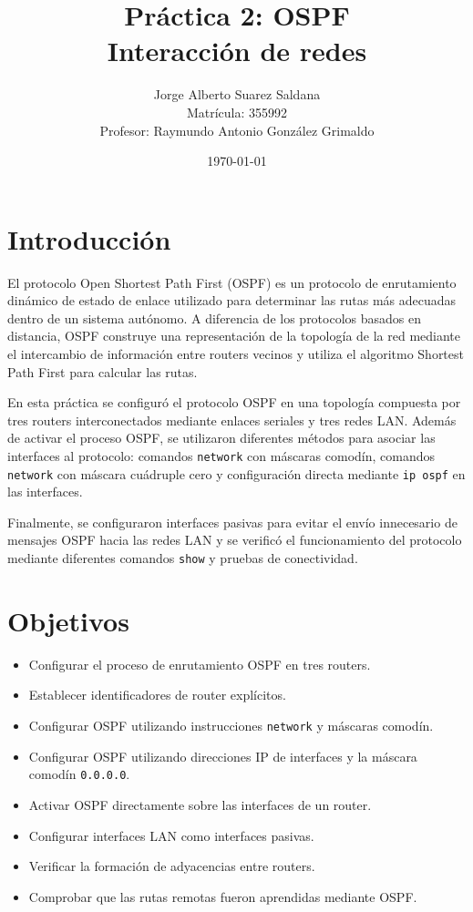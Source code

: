 \documentclass[12pt,a4paper]{article}
\title{
Práctica 2: OSPF\\[0.5em]
\large Interacción de redes
}
\author{
Jorge Alberto Suarez Saldana\\
\small Matrícula: 355992\\
\small Profesor: Raymundo Antonio González Grimaldo
}
\date{\today}
\begin{document}
\maketitle

\section{Introducción}

El protocolo Open Shortest Path First (OSPF) es un protocolo de
enrutamiento dinámico de estado de enlace utilizado para determinar las
rutas más adecuadas dentro de un sistema autónomo. A diferencia de los
protocolos basados en distancia, OSPF construye una representación de la
topología de la red mediante el intercambio de información entre
routers vecinos y utiliza el algoritmo Shortest Path First para
calcular las rutas.

En esta práctica se configuró el protocolo OSPF en una topología
compuesta por tres routers interconectados mediante enlaces seriales y
tres redes LAN. Además de activar el proceso OSPF, se utilizaron
diferentes métodos para asociar las interfaces al protocolo: comandos
\texttt{network} con máscaras comodín, comandos \texttt{network} con
máscara cuádruple cero y configuración directa mediante
\texttt{ip ospf} en las interfaces.

Finalmente, se configuraron interfaces pasivas para evitar el envío
innecesario de mensajes OSPF hacia las redes LAN y se verificó el
funcionamiento del protocolo mediante diferentes comandos
\texttt{show} y pruebas de conectividad.

\section{Objetivos}

\begin{itemize}
    \item Configurar el proceso de enrutamiento OSPF en tres routers.
    \item Establecer identificadores de router explícitos.
    \item Configurar OSPF utilizando instrucciones \texttt{network} y
    máscaras comodín.
    \item Configurar OSPF utilizando direcciones IP de interfaces y la
    máscara comodín \texttt{0.0.0.0}.
    \item Activar OSPF directamente sobre las interfaces de un router.
    \item Configurar interfaces LAN como interfaces pasivas.
    \item Verificar la formación de adyacencias entre routers.
    \item Comprobar que las rutas remotas fueron aprendidas mediante
    OSPF.
\end{itemize}
\end{document}
